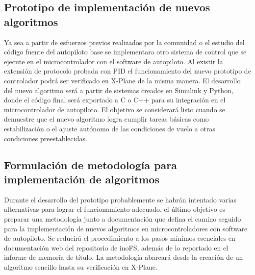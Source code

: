 \subsection{Prototipo de implementación de nuevos algoritmos}

Ya sea a partir de esfuerzos previos realizados por la comunidad o el estudio del código fuente del autopiloto base se implementara otro sistema de control que se ejecute en el microcontrolador con el software de autopiloto. Al existir la extensión de protocolo probada con PID el funcionamiento del nuevo prototipo de controlador podrá ser verificado en X-Plane de la misma manera. El desarrollo del nuevo algoritmo será a partir de sistemas creados en Simulink y Python, donde el código final será exportado a C o C++ para su integración en el microcontrolador de autopiloto. El objetivo se considerará listo cuando se demuestre que el nuevo algoritmo logra cumplir tareas básicas como estabilización o el ajuste autónomo de las condiciones de vuelo a otras condiciones preestablecidas.

\subsection{Formulación de metodología para implementación de algoritmos}

Durante el desarrollo del prototipo probablemente se habrán intentado varias alternativas para lograr el funcionamiento adecuado, el último objetivo es preparar una metodología junto a documentación que defina el camino seguido para la implementación de nuevos algoritmos en microcontroladores con software de autopiloto. Se reducirá el procedimiento a los pasos mínimos esenciales en documentación web del repositorio de inoFS, además de lo reportado en el informe de memoria de título. La metodología abarcará desde la creación de un algoritmo sencillo hasta su verificación en X-Plane.